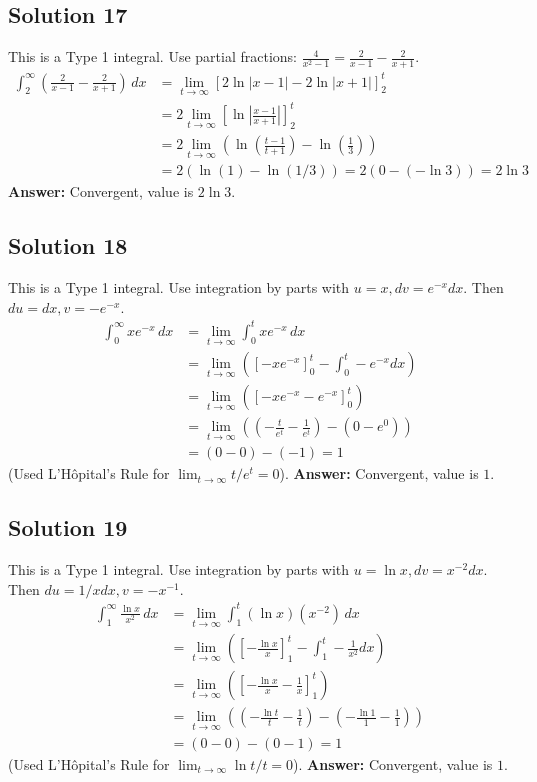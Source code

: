 \documentclass{article}
\begin{document}
\subsection*{Solution 17}
This is a Type 1 integral. Use partial fractions: $\frac{4}{x^2-1} = \frac{2}{x-1} - \frac{2}{x+1}$.
\begin{align*}
\int_{2}^{\infty} \left(\frac{2}{x-1} - \frac{2}{x+1}\right) \,dx &= \lim_{t \to \infty} \left[ 2\ln|x-1| - 2\ln|x+1| \right]_{2}^{t} \\
&= 2 \lim_{t \to \infty} \left[ \ln\left|\frac{x-1}{x+1}\right| \right]_{2}^{t} \\
&= 2 \lim_{t \to \infty} \left( \ln\left(\frac{t-1}{t+1}\right) - \ln\left(\frac{1}{3}\right) \right) \\
&= 2(\ln(1) - \ln(1/3)) = 2(0 - (-\ln 3)) = 2\ln 3
\end{align*}
\textbf{Answer:} Convergent, value is $2\ln 3$.

\subsection*{Solution 18}
This is a Type 1 integral. Use integration by parts with $u=x, dv=e^{-x}dx$. Then $du=dx, v=-e^{-x}$.
\begin{align*}
\int_{0}^{\infty} x e^{-x} \,dx &= \lim_{t \to \infty} \int_{0}^{t} x e^{-x} \,dx \\
&= \lim_{t \to \infty} \left( \left[-xe^{-x}\right]_{0}^{t} - \int_{0}^{t} -e^{-x} dx \right) \\
&= \lim_{t \to \infty} \left( [-xe^{-x} - e^{-x}]_{0}^{t} \right) \\
&= \lim_{t \to \infty} \left( (-\frac{t}{e^t} - \frac{1}{e^t}) - (0 - e^0) \right) \\
&= (0 - 0) - (-1) = 1
\end{align*}
(Used L'Hôpital's Rule for $\lim_{t \to \infty} t/e^t = 0$).
\textbf{Answer:} Convergent, value is $1$.

\subsection*{Solution 19}
This is a Type 1 integral. Use integration by parts with $u=\ln x, dv=x^{-2}dx$. Then $du=1/x dx, v=-x^{-1}$.
\begin{align*}
\int_{1}^{\infty} \frac{\ln x}{x^2} \,dx &= \lim_{t \to \infty} \int_{1}^{t} (\ln x)(x^{-2}) \,dx \\
&= \lim_{t \to \infty} \left( \left[-\frac{\ln x}{x}\right]_{1}^{t} - \int_{1}^{t} -\frac{1}{x^2} dx \right) \\
&= \lim_{t \to \infty} \left( [-\frac{\ln x}{x} - \frac{1}{x}]_{1}^{t} \right) \\
&= \lim_{t \to \infty} \left( (-\frac{\ln t}{t} - \frac{1}{t}) - (-\frac{\ln 1}{1} - \frac{1}{1}) \right) \\
&= (0 - 0) - (0 - 1) = 1
\end{align*}
(Used L'Hôpital's Rule for $\lim_{t \to \infty} \ln t / t = 0$).
\textbf{Answer:} Convergent, value is $1$.
\end{document}
